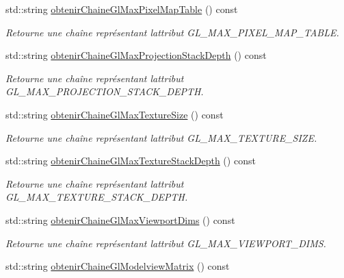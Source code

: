 \begin{DoxyCompactItemize}
std\+::string \hyperlink{group__utilitaire_ga266533ff4a35f65c19be95594d07f435}{obtenir\+Chaine\+Gl\+Max\+Pixel\+Map\+Table} () const 
\begin{DoxyCompactList}\small\item\em Retourne une chaîne représentant l\textquotesingle{}attribut G\+L\+\_\+\+M\+A\+X\+\_\+\+P\+I\+X\+E\+L\+\_\+\+M\+A\+P\+\_\+\+T\+A\+B\+L\+E. \end{DoxyCompactList}\item 
std\+::string \hyperlink{group__utilitaire_ga8c2d3530aa09867d9c01d8433839011e}{obtenir\+Chaine\+Gl\+Max\+Projection\+Stack\+Depth} () const 
\begin{DoxyCompactList}\small\item\em Retourne une chaîne représentant l\textquotesingle{}attribut G\+L\+\_\+\+M\+A\+X\+\_\+\+P\+R\+O\+J\+E\+C\+T\+I\+O\+N\+\_\+\+S\+T\+A\+C\+K\+\_\+\+D\+E\+P\+T\+H. \end{DoxyCompactList}\item 
std\+::string \hyperlink{group__utilitaire_gaeba7eaad6682c2c4aa8925501601c606}{obtenir\+Chaine\+Gl\+Max\+Texture\+Size} () const 
\begin{DoxyCompactList}\small\item\em Retourne une chaîne représentant l\textquotesingle{}attribut G\+L\+\_\+\+M\+A\+X\+\_\+\+T\+E\+X\+T\+U\+R\+E\+\_\+\+S\+I\+Z\+E. \end{DoxyCompactList}\item 
std\+::string \hyperlink{group__utilitaire_ga9aac1a0891487831a30125fca75bec93}{obtenir\+Chaine\+Gl\+Max\+Texture\+Stack\+Depth} () const 
\begin{DoxyCompactList}\small\item\em Retourne une chaîne représentant l\textquotesingle{}attribut G\+L\+\_\+\+M\+A\+X\+\_\+\+T\+E\+X\+T\+U\+R\+E\+\_\+\+S\+T\+A\+C\+K\+\_\+\+D\+E\+P\+T\+H. \end{DoxyCompactList}\item 
std\+::string \hyperlink{group__utilitaire_ga0dad12ef08cd32b9fb94e214f00a95a9}{obtenir\+Chaine\+Gl\+Max\+Viewport\+Dims} () const 
\begin{DoxyCompactList}\small\item\em Retourne une chaîne représentant l\textquotesingle{}attribut G\+L\+\_\+\+M\+A\+X\+\_\+\+V\+I\+E\+W\+P\+O\+R\+T\+\_\+\+D\+I\+M\+S. \end{DoxyCompactList}\item 
std\+::string \hyperlink{group__utilitaire_ga44c62c93a914527f821b2aef913fada7}{obtenir\+Chaine\+Gl\+Modelview\+Matrix} () const 

\end{DoxyCompactItemize}
